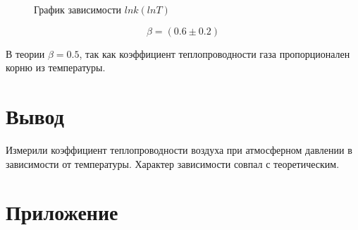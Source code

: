 \documentclass[a4paper, 12pt]{article}
\begin{document}
            \begin{figure}[ht]
                \caption{График зависимости $ln k (lnT)$}
                \label{lnk_graph}
            \end{figure}

            $$ \beta = (0.6 \pm 0.2) $$

            В теории $ \beta = 0.5$, так как коэффициент теплопроводности газа пропорционален корню из температуры.

    \section{Вывод}

        Измерили коэффициент теплопроводности воздуха при атмосферном давлении в зависимости от температуры. Характер зависимости совпал с теоретическим.

    \section{Приложение}
\end{document}
